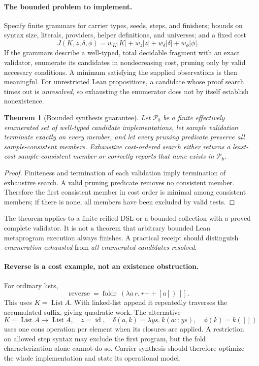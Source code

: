 \documentclass[11pt,a4paper]{article}
\newtheorem{theorem}[proposition]{Theorem}
\theoremstyle{definition}
\theoremstyle{remark}
\newcommand{\List}{\operatorname{List}}
\newcommand{\foldr}{\operatorname{foldr}}
\newcommand{\rev}{\operatorname{reverse}}
\newcommand{\concat}{\mathbin{+\!+}}
\begin{document}
\paragraph{The bounded problem to implement.}
Specify finite grammars for carrier types, seeds, steps, and finishers; bounds
on syntax size, literals, providers, helper definitions, and universes; and a
fixed cost
\[
 J(K,z,\delta,\phi)=w_K|K|+w_z|z|+w_\delta|\delta|+w_\phi|\phi|.
\]
If the grammars describe a well-typed, total decidable fragment with an exact
validator, enumerate its candidates in nondecreasing cost, pruning only by
valid necessary conditions. A minimum satisfying the supplied observations
is then meaningful. For unrestricted Lean propositions, a candidate whose
proof search times out is \emph{unresolved}, so exhausting the enumerator does
not by itself establish nonexistence.

\begin{theorem}[Bounded synthesis guarantee]\label{thm:bounded}
Let $\mathcal P_b$ be a finite effectively enumerated set of well-typed candidate
implementations, let sample validation terminate exactly on every member, and
let every pruning predicate preserve all sample-consistent members. Exhaustive
cost-ordered search either returns a least-cost sample-consistent member or
correctly reports that none exists in $\mathcal P_b$.
\end{theorem}
\begin{proof}
Finiteness and termination of each validation imply termination of exhaustive
search. A valid pruning predicate removes no consistent member. Therefore the
first consistent member in cost order is minimal among consistent members;
if there is none, all members have been excluded by valid tests.
\end{proof}

The theorem applies to a finite reified DSL or a bounded collection with a
proved complete validator. It is not a theorem that arbitrary bounded Lean
metaprogram execution always finishes. A practical receipt should distinguish
\emph{enumeration exhausted} from \emph{all enumerated candidates resolved}.

\paragraph{Reverse is a cost example, not an existence obstruction.}
For ordinary lists,
\[
 \rev=\foldr\,(\lambda a\,r.\ r\concat[a])\,[] .
\]
This uses $K=\List A$. With linked-list append it repeatedly traverses the
accumulated suffix, giving quadratic work. The alternative
\[
 K=\List A\to\List A,\quad z=\operatorname{id},\quad
 \delta(a,k)=\lambda ys.\ k(a::ys),\quad\phi(k)=k([])
\]
uses one cons operation per element when its closures are applied. A restriction
on allowed step syntax may exclude the first program, but the fold
characterization alone cannot do so. Carrier synthesis should therefore
optimize the whole implementation and state its operational model.
\end{document}
